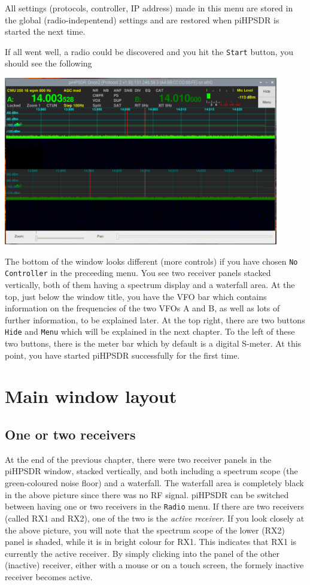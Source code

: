 \documentclass[12pt]{book}
\begin{document}
All settings (protocols, controller, IP address) made in this menu are stored in the global (radio-indepentend) settings
and are restored when piHPSDR is started the next time. 

If all went well, a radio could be discovered and you hit the \texttt{Start} button, you should see the following

\begin{center}
\includegraphics[width=12cm]{FirstDisplay.png}
\end{center}

The bottom of the window looks different (more controls) if you have chosen \texttt{No Controller} in the preceeding menu.
You see two receiver panels stacked vertically, both of them having a spectrum display and a waterfall area. At the top,
just below the window title, you have the VFO bar which contains information on the frequencies of the two VFOs A and B,
as well as lots of further information, to be explained later. At the top right, there are two buttons \texttt{Hide}
and \texttt{Menu} which will be explained in the next chapter. To the left of these two buttons, there is the meter
bar which by default is a digital S-meter. At this point, you have started piHPSDR successfully for the first time.

\chapter{Main window layout}

\section{One or two receivers}
At the end of the previous chapter, there were two receiver panels in the
piHPSDR window, stacked vertically, and both including a spectrum scope
(the green-coloured noise floor) and a waterfall. The waterfall area
is completely black in the above picture since there was no RF signal.
piHPSDR can be switched between having one or two receivers in the
\texttt{Radio} menu. If there are two receivers (called RX1 and RX2),
 one of the two is the \textit{active receiver}. If you look closely
 at the above picture, you will note that the spectrum scope of
 the lower (RX2) panel is shaded, while it is in bright colour for RX1.
 This indicates that RX1 is currently the active receiver. By simply
 clicking into the panel of the other (inactive) receiver, either with
 a mouse or on a touch screen, the formely inactive receiver becomes
 active.
 
\end{document}
